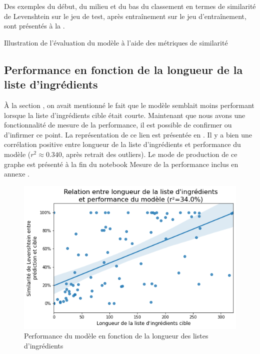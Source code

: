             Des exemples du début, du milieu et du bas du classement en termes de similarité de Levenshtein sur le jeu de test, après entraînement sur le jeu d'entraînement, sont présentés à la .
            \begin{table}[htbp]
                \begin{center}
                {\tiny
                
                }
                \caption{Illustration de l'évaluation du modèle à l'aide des métriques de similarité}
                \label{tbl:similarity_illustration}
                \end{center}
            \end{table}

        \subsection{Performance en fonction de la longueur de la liste d'ingrédients}

        \`{A} la section , on avait mentionné le fait que le modèle semblait moins performant lorsque la liste d'ingrédients cible était courte.
        Maintenant que nous avons une fonctionnalité de mesure de la performance, il est possible de confirmer ou d'infirmer ce point.
        La représentation de ce lien est présentée en .
        Il y a bien une corrélation positive entre longueur de la liste d'ingrédients et performance du modèle ($r^{2} \approx 0.340$, après retrait des outliers).
        Le mode de production de ce graphe est présenté à la fin du notebook \og Mesure de la performance \fg inclus en annexe .
        \begin{figure}[htbp]
            \begin{center}
            \includegraphics[width=0.7\linewidth]{img/perf_vs_length.png}
            \end{center}
            \caption{Performance du modèle en fonction de la longueur des listes d'ingrédients}
            \label{fig:perf_vs_length}
        \end{figure}



